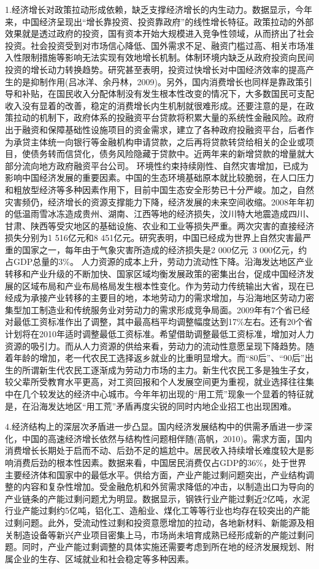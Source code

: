 1.经济增长对政策拉动形成依赖，缺乏支撑经济增长的内生动力。数据显示，今年来，中国经济呈现出“增长靠投资、投资靠政府”的线性增长特征。政策拉动的外部效果就是透过政府的投资，国有资本开始大规模进入竞争性领域，从而挤出了社会投资。社会投资受到对市场信心降低、国外需求不足、融资门槛过高、相关市场准入性限制措施等影响无法实现有效地增长机制。体制环境内缺乏从政府投资向民间投资的增长动力转换趋势。研究甚至表明，投资过快增长对中国经济效率的提高产生的是抑制作用(吕冰洋、余丹林，2009)。另外，国内消费增长也同样是靠政策引导和补贴，在国民收入分配体制没有发生根本性改变的情况下，大多数国民可支配收入没有显着的改善，稳定的消费增长内生机制就很难形成。还要注意的是，在政策拉动的机制下，政府体系的投融资平台贷款将积累大量的系统性金融风险。政府出于融资和保障基础性设施项目的资金需求，建立了各种政府投融资平台，后者作为承贷主体统一向银行等金融机构申请贷款，之后再将贷款转贷给相关的企业或项目，使债务转而信贷化，债务风险隐藏于贷款中。近两年来的新增贷款的增量就大部分流向地方政府融资平台公司。 环境性约束持续刚性、自然灾害增加，已成为影响中国经济发展的重要因素。中国的生态环境基础原本就比较脆弱，在人口压力和粗放型经济等多种因素作用下，目前中国生态安全形势已十分严峻。加之，自然灾害频仍，经济增长的资源支撑能力下降，经济发展的未来空间收缩。2008年年初的低温雨雪冰冻造成贵州、湖南、江西等地的经济损失，汶川特大地震造成四川、甘肃、陕西等受灾地区的基础设施、农业和工业等损失严重。两次灾害的直接经济损失分别为1 516亿元和8 451亿元。研究表明，中国已经成为世界上自然灾害最严重的国家之一，每年由于气象灾害所造成的经济损失是2 000亿元~3 000亿元，约占GDP总量的3$\%$。 人力资源的成本上升，劳动力流动性下降。沿海发达地区产业转移和产业升级的不断加快、国家区域均衡发展政策的密集出台，促成中国经济发展的区域布局和产业布局格局发生根本性变化。作为劳动力传统输出大省，现在已经成为承接产业转移的主要目的地，本地劳动力的需求增加，与沿海地区劳动力密集型加工制造业和传统服务业对劳动力的需求形成竞争局面。2009年有7个省已经对最低工资标准作出了调整，其中最高档平均调整幅度达到17$\%$左右。还有20个省计划将在2010年适时调整最低工资标准。希望借助调整最低工资标准，增加对人力资源的吸引力。而从人力资源的供给来看，劳动力的流动性意愿呈现下降趋势。随着年龄的增加，老一代农民工选择返乡就业的比重明显增大。而“80后”、“90后”出生的所谓新生代农民工逐渐成为劳动力市场的主力。新生代农民工多是独生子女，较父辈所受教育水平更高，对工资回报和个人发展空间更为重视，就业选择往往集中在几个较发达的经济中心城市。今年年初出现的“用工荒”现象一个显着的特征就是，在沿海发达地区“用工荒”矛盾再度尖锐的同时内地企业招工也出现困难。

4.经济结构上的深层次矛盾进一步凸显。国内经济发展结构中的供需矛盾进一步深化，中国的高速经济增长依然与结构性问题相伴随(高帆，2010)。需求方面，国内消费增长长期处于启而不动、后劲不足的尴尬中。居民收入持续增长难度较大是影响消费后劲的根本性因素。数据来看，中国居民消费仅占GDP的36$\%$，处于世界主要经济体和国家中的最低水平。供给方面，产业产能过剩问题突出，产业结构调整的内容和复杂性增加。受金融危机和外贸需求降低的冲击，以制造出口为导向的产业链条的产能过剩问题尤为明显。数据显示，钢铁行业产能过剩近2亿吨，水泥行业产能过剩约5亿吨，铝化工、造船业、煤化工等等行业也均存在较突出的产能过剩问题。此外，受流动性过剩和投资意愿增加的拉动，各地新材料、新能源及相关制造设备等新兴产业项目密集上马，市场尚未培育成熟已经形成新的产能过剩问题。同时，产业产能过剩调整的具体实施还需要考虑到所在地的经济发展规划、附属企业的生存、区域就业和社会稳定等多种因素。

